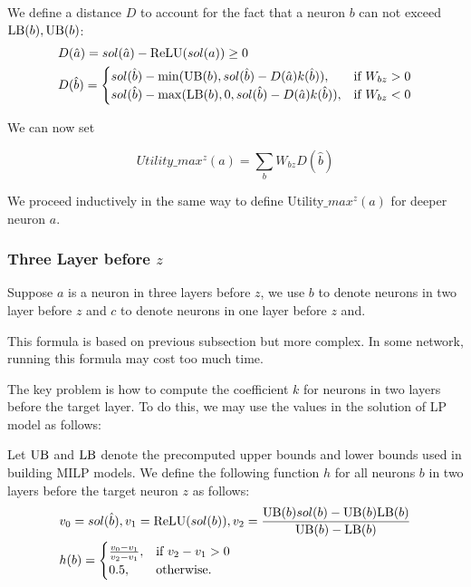 We define a distance $D$ to account for the fact that a neuron $b$ 
can not exceed $\mathrm{LB}(b),\mathrm{UB}(b)$:
	\begin{align*}
		&D(\hat{a}) = sol(\hat{a}) - \mathrm{ReLU}(sol(a)) \geq 0\\
			&D(\hat{b}) =
		\begin{cases}
			sol(\hat{b}) - \min(\mathrm{UB}(b), sol(\hat{b}) - D(\hat{a}) k(\hat{b})), & \text{if }  W_{bz} > 0 \\
			sol(\hat{b}) - \max(\mathrm{LB}(b), 0, sol(\hat{b}) -D(\hat{a}) k(\hat{b})), & \text{if }W_{bz} < 0\\
		\end{cases}
		\end{align*}

We can now set 

$$ Utility\_max^z(a) = \sum_b W_{bz} D(\hat{b})$$
 
We proceed inductively in the same way to define Utility$\_max^z(a)$ for deeper neuron $a$.

\iffalse
\subsubsection*{Three Layer before  $z$} 

Suppose $a$ is a neuron in three layers before $z$, we use $b$ to denote neurons in two layer before $z$ and $c$ to denote neurons in one layer before $z$ and. 

This formula is based on previous subsection but more complex. In some network, running this formula may cost too much time. 

The key problem is how to compute the coefficient $k$ for neurons in two layers before the target layer. To do this, we may use the values in the solution of LP model as follows:

\begin{definition}\label{3layer}
Let $\mathrm{UB}$ and $\mathrm{LB}$ denote the precomputed upper bounds and lower bounds used in building MILP models. We define the following function $h$ for all neurons $b$ in two layers before the target neuron $z$ as follows:
	\begin{align}
		&v_0 = sol(\hat{b}), v_1 = \mathrm{ReLU}(sol(b)), v_2 = \frac{\mathrm{UB}(b)sol(b)-\mathrm{UB}(b)\mathrm{LB}(b)}{\mathrm{UB}(b)-\mathrm{LB}(b)}\\
		&h(b) =
		\begin{cases}
			\frac{v_0-v_1}{v_2-v_1}, & \text{if } v_2-v_1 > 0\\
			0.5, & \text{otherwise.}
		\end{cases}
	\end{align} 
\end{definition} 

